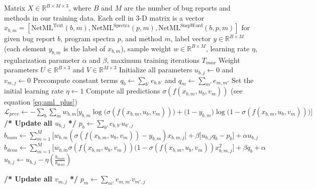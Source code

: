 \begin{algorithm*}[!t]
	\begin{algorithmic}[1]
		\Require Matrix $X \in \mathbb{R}^{B \times M \times 3}$, where $B$ and $M$ are the number of bug reports and methods in our training data. Each cell in 3-D matrix is a vector $x_{b,m} = [\text{NetML}^{\text{Text}}(b,m), \text{NetML}^{\text{Spectra}}(p,m), \text{NetML}^{\text{SuspWord}}(b,p,m)]$ for given bug report $b$, program spectra $p$, and method $m$, label vector $y \in \mathbb{R}^{B \times M}$ (each element $y_{b, m}$ is the label of $x_{b, m}$), sample weight $w \in \mathbb{R}^{B \times M}$, learning rate $\eta$, regularization parameter $\alpha$ and $\beta$, maximum training iterations $T_{max}$
		\Ensure Weight parameters $U \in \mathbb{R}^{B \times 3}$ and $ V \in \mathbb{R}^{M \times 3}$ 
		\State Initialize all parameters $u_{b,j} \leftarrow 0$ and $v_{m,j} \leftarrow 0$
		\State Precompute constant terms $q_b \leftarrow \sum_{b'} e_{b,b'}$ and $q_m \leftarrow \sum_{m'} e_{m,m'}$
		\State Set the initial learning rate $\eta \leftarrow 1$
		\Repeat 
		\State Compute all predictions $\sigma(f(x_{b,m}, u_b, v_m))$ (see equation \ref{eq:aml_plus})
		\State $\mathcal{L}_{prev} \leftarrow -\sum_{b} \sum_{m} w_{b,m} \big[ y_{b,m} \log \big( \sigma(f(x_{b,m}, u_b, v_m)) \big) + \big( 1 - y_{b,m} \big) \log \big(1 - \sigma(f(x_{b,m}, u_b, v_m)) \big) \big]$
		\State \textbf{/* Update all $u_{b,j}$ */}
		\State $p_{b} \leftarrow \sum_{b'} e_{b,b'} u_{b',j}$
		\EndFor
		\State $b_{num} \leftarrow \sum_{m=1}^{M} \big[ w_{b,m} (\sigma(f(x_{b,m}, u_b, v_m)) - y_{b,m}) x_{b,m,j} \big] + \beta \big[ u_{b,j} q_b - p_{b} \big] + \alpha u_{b,j}$
		\State $b_{deno} \leftarrow \sum_{m=1}^{M} \big[ w_{b,m} \sigma(f(x_{b,m}, u_b, v_m)) (1 - \sigma(f(x_{b,m}, u_b, v_m)) x_{b,m,j}^2 \big] + \beta q_b + \alpha$
		\State $u_{b,j} \leftarrow u_{b,j} - \eta \left( \frac{b_{num}}{b_{deno}} \right)$
		\EndFor
		
		\State \textbf{/* Update all $v_{m,j}$ */}
		\State $p_{m} \leftarrow \sum_{m'} e_{m,m'} v_{m',j}$
		\EndFor
		

\end{algorithmic}
\end{algorithm*}
